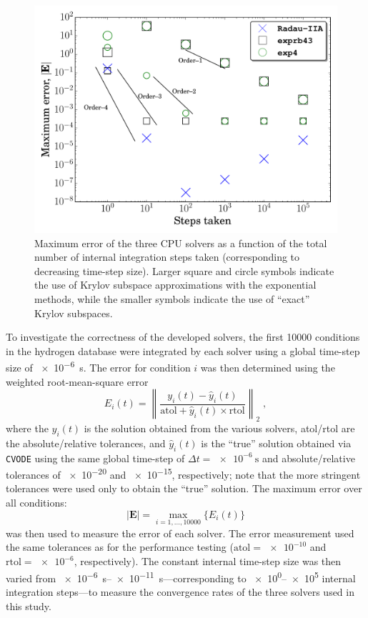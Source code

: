 \documentclass[preprint,review,11pt]{elsarticle}
\begin{document}
\begin{figure}[htbp]
  \centering
  \includegraphics[width=0.7\linewidth]{c_nco_nosmem_error.pdf}
  \caption{Maximum error of the three CPU solvers as a function of the total number of internal integration steps taken (corresponding to decreasing time-step size).
  Larger square and circle symbols indicate the use of Krylov subspace approximations with the exponential methods, while the smaller symbols indicate the use of ``exact'' Krylov subspaces.}
  \label{F:convergence}
 \end{figure}

To investigate the correctness of the developed solvers, the first \num{10000} conditions in the hydrogen database were integrated by each solver using a global time-step size of \SI{e-6}{\second}.
The error for condition $i$ was then determined using the weighted root-mean-square error
\begin{equation}
 E_i(t) = \left\lVert\frac{y_i(t) - \hat{y}_i(t)}{\text{atol} + \hat{y}_i(t) \times \text{rtol}}\right\rVert_2 \;,
\end{equation}
where the $y_i(t)$ is the solution obtained from the various solvers, atol\slash rtol are the absolute\slash relative tolerances, and $\hat{y}_i(t)$ is the ``true'' solution obtained via \texttt{CVODE} using the same global time-step of $\Delta t = \SI{e-6}{\second}$ and absolute\slash relative tolerances of \num{e-20} and \num{e-15}, respectively; note that the more stringent tolerances were used only to obtain the ``true'' solution.
The maximum error over all conditions:
\begin{equation}
 \left\lvert\textbf{E}\right\rvert = \max_{i= 1, \dots, \num{10000}}\{E_i(t)\}
\end{equation}
was then used to measure the error of each solver.
The error measurement used the same tolerances as for the performance testing ($\text{atol} = \num{e-10}$ and $\text{rtol} = \num{e-6}$, respectively).
The constant internal time-step size was then varied from \SIrange{e-6}{e-11}{\second}---corresponding to \numrange[retain-zero-exponent]{e0}{e5} internal integration steps---to measure the convergence rates of the three solvers used in this study.
\end{document}
